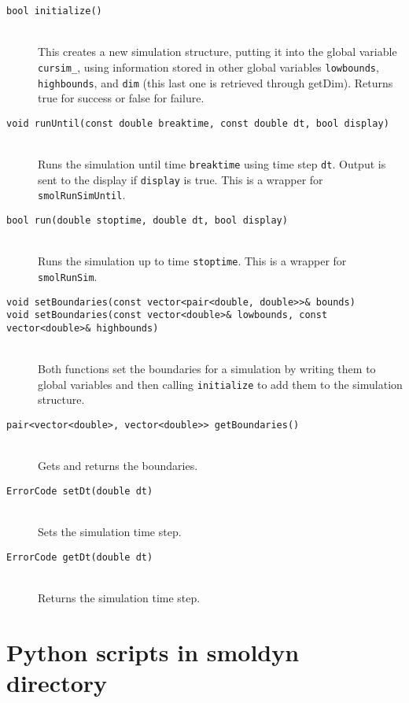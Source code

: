 \documentclass {book}
\newcommand {\ttt} {\texttt}
\begin{document}
\begin{description}
\item[\ttt{bool initialize()}]
\hfill \\
This creates a new simulation structure, putting it into the global variable \ttt{cursim\_}, using information stored in other global variables \ttt{lowbounds}, \ttt{highbounds}, and \ttt{dim} (this last one is retrieved through getDim). Returns true for success or false for failure.

\item[\ttt{void runUntil(const double breaktime, const double dt, bool display)}]
\hfill \\
Runs the simulation until time \ttt{breaktime} using time step \ttt{dt}. Output is sent to the display if \ttt{display} is true. This is a wrapper for \ttt{smolRunSimUntil}.

\item[\ttt{bool run(double stoptime, double dt, bool display)}]
\hfill \\
Runs the simulation up to time \ttt{stoptime}. This is a wrapper for \ttt{smolRunSim}.

\item[\ttt{void setBoundaries(const vector<pair<double, double>>\& bounds)}]
\item[\ttt{void setBoundaries(const vector<double>\& lowbounds, const vector<double>\& highbounds)}]
\hfill \\
Both functions set the boundaries for a simulation by writing them to global variables and then calling \ttt{initialize} to add them to the simulation structure.

\item[\ttt{pair<vector<double>, vector<double>> getBoundaries()}]
\hfill \\
Gets and returns the boundaries.

\item[\ttt{ErrorCode setDt(double dt)}]
\hfill \\
Sets the simulation time step.

\item[\ttt{ErrorCode getDt(double dt)}]
\hfill \\
Returns the simulation time step.

\end{description}

\section{Python scripts in smoldyn directory}
\end{document}
